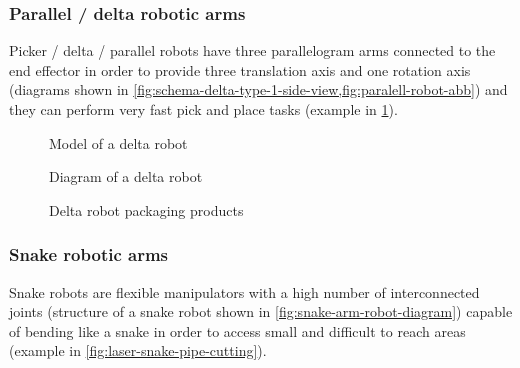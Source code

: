 \subsubsection{Parallel / delta robotic arms}

Picker / delta / parallel robots have three parallelogram arms connected to the end effector in order to provide three translation axis and one rotation axis (diagrams shown in \cref{fig:schema-delta-type-1-side-view,fig:paralell-robot-abb}) and they can perform very fast pick and place tasks (example in \cref{fig:picker-parallel-robot-fanuc}).

\begin{figure}[H]
	\begin{floatrow}[3]
		{\caption[Model of a delta robot]{Model of a delta robot\protect\footnotemark}\label{fig:paralell-robot-abb}}

		{\caption[Diagram of a delta robot]{Diagram of a delta robot\protect\footnotemark}\label{fig:schema-delta-type-1-side-view}}

		{\caption[Delta robot packaging products]{Delta robot packaging products\protect\footnotemark}\label{fig:picker-parallel-robot-fanuc}}
	\end{floatrow}
\end{figure}


\subsubsection{Snake robotic arms}

Snake robots are flexible manipulators with a high number of interconnected joints (structure of a snake robot shown in \cref{fig:snake-arm-robot-diagram}) capable of bending like a snake in order to access small and difficult to reach areas (example in \cref{fig:laser-snake-pipe-cutting}).


